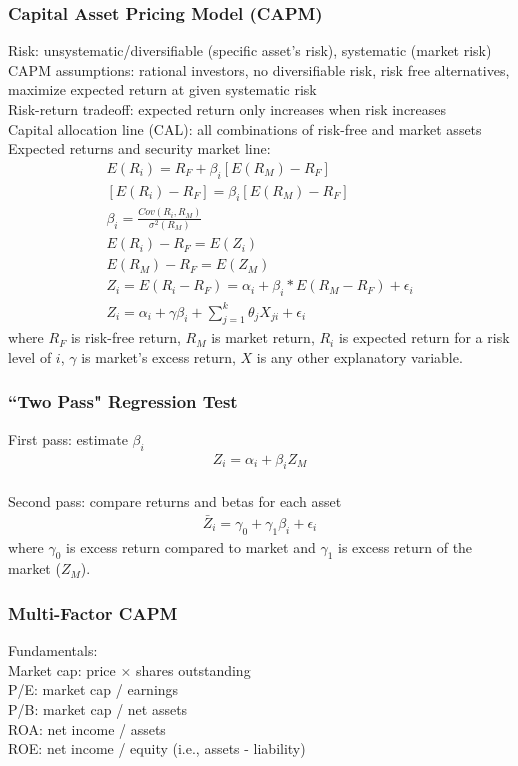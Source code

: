 \documentclass[12pt]{article}
\numberwithin{equation}{section}
\begin{document}
\subsubsection{Capital Asset Pricing Model (CAPM)}
Risk: unsystematic/diversifiable (specific asset's risk), systematic (market risk) \\[0.5cm]
CAPM assumptions: rational investors, no diversifiable risk, risk free alternatives, maximize expected return at given systematic risk \\[0.5cm]
Risk-return tradeoff: expected return only increases when risk increases \\[0.5cm]
Capital allocation line (CAL): all combinations of risk-free and market assets \\[0.5cm]
Expected returns and security market line:
\begin{gather}
    E(R_i) = R_F + \beta_i [E(R_M) - R_F] \\
    [E(R_i) - R_F] = \beta_i [E(R_M) - R_F] \\
    \beta_i = \frac{Cov(R_i,R_M)}{\sigma^2(R_M)} \\
    E(R_i) - R_F = E(Z_i) \\
    E(R_M) - R_F = E(Z_M) \\
    Z_i = E(R_i - R_F) = \alpha_i + \beta_i * E(R_M - R_F) + \epsilon_i \\
    Z_i = \alpha_i + \gamma \beta_i + \sum_{j=1}^{k} \theta_j X_{ji} + \epsilon_i
\end{gather}
where $R_F$ is risk-free return, $R_M$ is market return, $R_i$ is expected return for a risk level of $i$, $\gamma$ is market's excess return, $X$ is any other explanatory variable.

\subsubsection{``Two Pass" Regression Test}
First pass: estimate $\beta_i$
\begin{gather}
    Z_i = \alpha_i + \beta_i Z_M
\end{gather} \\
Second pass: compare returns and betas for each asset
\begin{gather}
    \bar{Z}_i = \gamma_0 + \gamma_1 \beta_i + \epsilon_i
\end{gather}
where $\gamma_0$ is excess return compared to market and $\gamma_1$ is excess return of the market ($Z_M$).

\subsubsection{Multi-Factor CAPM}
Fundamentals: \\
Market cap: price $\times$ shares outstanding \\
P/E: market cap / earnings \\
P/B: market cap / net assets \\
ROA: net income / assets \\
ROE: net income / equity (i.e., assets - liability)
\end{document}
